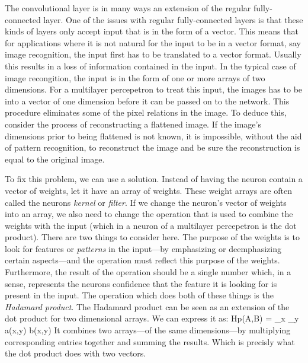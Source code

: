 The convolutional layer is in many ways an extension of the regular fully-connected layer.
One of the issues with regular fully-connected layers is that these kinds of layers only accept input that is in the form of a vector.
This means that for applications where it is not natural for the input to be in a vector format, say image recognition, the input first has to be translated to a vector format.
Usually this results in a loss of information contained in the input.
In the typical case of image recongition, the input is in the form of one or more arrays of two dimensions.
For a multilayer percepetron to treat this input, the images has to be  into a vector of one dimension before it can be passed on to the network.
This procedure eliminates some of the pixel relations in the image.
To deduce this, consider the process of reconstructing a flattened image.
If the image's dimensions prior to being flattened is not known, it is impossible, without the aid of pattern recognition, to reconstruct the image and be sure the reconstruction is equal to the original image.

To fix this problem, we can use a  solution.
Instead of having the neuron contain a vector of weights, let it have an array of weights.
These weight arrays are often called the neurons {\em kernel} or {\em filter}.
If we change the neuron's vector of weights into an array, we also need to change the operation that is used to combine the weights with the input (which in a neuron of a multilayer percepetron is the dot product).
There are two things to consider here.
The purpose of the weights is to look for features or {\em patterns} in the input---by emphasizing or deemphasizing certain aspects---and the operation must reflect this purpose of the weights.
Furthermore, the result of the operation should be a single number which, in a sense, represents the neurons  confidence that the feature it is looking for is present in the input.
The operation which does both of these things is the {\em Hadamard product}.
The Hadamard product can be seen as an extension of the dot product for two dimensional arrays.
We can express it as:
\startformula
{\rm Hp}(A,B) = \sum_{x} \sum_{y} a(x,y) b(x,y)
\stopformula
It combines two arrays---of the same dimensions---by multiplying corresponding entries together and summing the results.
Which is precisly what the dot product does with two vectors.

